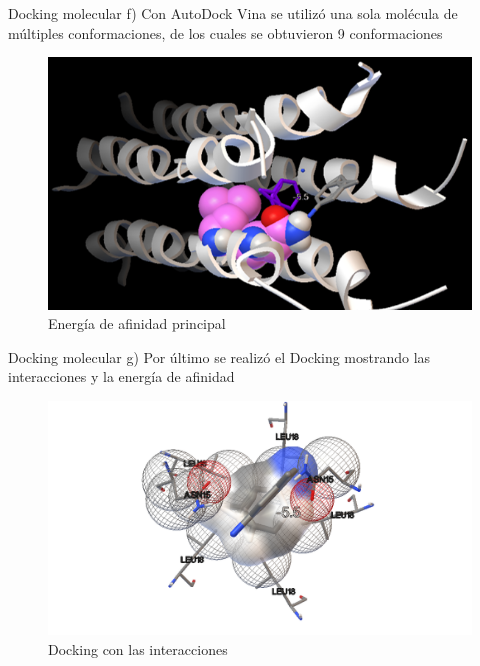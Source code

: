 \documentclass[11pt]{beamer}
\begin{document}
			
				\begin{frame}{Docking molecular}
			\justifying 
				f) Con AutoDock Vina se utilizó una sola molécula de múltiples conformaciones, de los cuales se obtuvieron 9 conformaciones 
			
			\begin{figure}[H]
				\centering
				\includegraphics[scale=0.5]{conformaciones.png}
				\caption{Energía de afinidad principal}
				\label{fig: Figura1}
			\end{figure}
		\end{frame} 
			
			
			
				\begin{frame}{Docking molecular}
			\justifying 
				g) Por último se realizó el Docking mostrando las interacciones y la energía de afinidad 
			
			\begin{figure}[H]
				\centering
				\includegraphics[scale=0.25]{Aminoacido y ligando.png}
				\caption{Docking con las interacciones}
				\label{fig: Figura1}
			\end{figure}
		\end{frame} 
		
\end{document}
